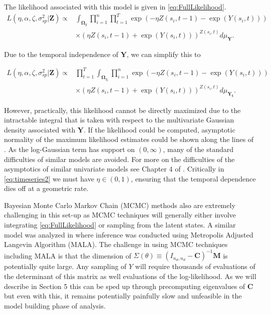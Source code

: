 \documentclass[11pt]{isuthesis}
\begin{document}
	The likelihood associated with this model is given in \eqref{eq:FullLikelihood}.
	\begin{align}
	L(\eta,\alpha,\zeta,\sigma_{sp}^2|\boldsymbol{Z}) \propto & \int_{\boldsymbol{\Omega}_y} \prod_{i=1}^{n}\prod_{t=1}^{T} \exp(-\eta Z(s_i,t-1)-\exp(Y(s_i,t)))\nonumber\\
	&\times \left(\eta Z(s_i,t-1)+\exp(Y(s_i,t))\right)^{Z(s_i,t)} d\mu_{\boldsymbol{Y}}\label{eq:FullLikelihood}.
	\end{align}
	
	Due to the temporal independence of $\boldsymbol{Y}$, we can simplify this to
	
	\begin{align}
	L(\eta,\alpha,\zeta,\sigma_{sp}^2|\boldsymbol{Z}) \propto & \prod_{t=1}^{T}\int_{\boldsymbol{\Omega}_{y_t}} \prod_{i=1}^{n} \exp(-\eta Z(s_i,t-1)-\exp(Y(s_i,t)))\nonumber\\
	&\times \left(\eta Z(s_i,t-1)+\exp(Y(s_i,t))\right)^{Z(s_i,t)} d\mu_{\boldsymbol{Y_t}}\label{eq:FullLikelihood2}.
	\end{align}
	
	However, practically, this likelihood cannot be directly maximized due to the intractable integral that is taken with respect to the multivariate Gaussian density associated with $\boldsymbol{Y}$.  If the likelihood could be computed, asymptotic normality of the maximum likelihood estimates could be shown along the lines of \cite{fokianos2009poisson}.  As the log-Gaussian term has support on $(0,\infty)$, many of the standard difficulties of similar models are avoided.  For more on the difficulties of the asymptotics of similar univariate models see Chapter 4 of \cite{davis2016handbook}. Critically in \eqref{eq:timeseries2} we must have $\eta \in (0,1)$, ensuring that the temporal dependence dies off at a geometric rate.
	
	Bayesian Monte Carlo Markov Chain (MCMC) methods also are extremely challenging in this set-up as MCMC techniques will generally either involve integrating \eqref{eq:FullLikelihood} or sampling from the latent states.  A similar model was analyzed in \cite{mohler2013modeling} where inference was conducted using Metropolis Adjusted Langevin Algorithm (MALA).  The challenge in using MCMC techniques including MALA is that the dimension of $\Sigma(\theta) \equiv (I_{n_d,n_d}-\boldsymbol{C})^{-1}\boldsymbol{M}$ is potentially quite large.  Any sampling of $Y$ will require thousands of evaluations of the determinant of this matrix as well evaluations of the log-likelihood.  As we will describe in Section 5 this can be sped up through precomputing eigenvalues of $\boldsymbol{C}$ but even with this, it remains potentially painfully slow and unfeasible in the model building phase of analysis.
	
\end{document}
